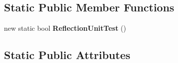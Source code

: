 \subsection*{Static Public Member Functions}
\begin{DoxyCompactItemize}
\item 
\hypertarget{class_s_e_mod_a_p_i_internal_1_1_a_p_i_1_1_entity_1_1_sector_1_1_sector_object_1_1_cube_grid_1_1da7f6e1e443b7b445548fcb53da9dcdc_a5f33f67f2f853c9a915188e126b1b757}{}new static bool {\bfseries Reflection\+Unit\+Test} ()\label{class_s_e_mod_a_p_i_internal_1_1_a_p_i_1_1_entity_1_1_sector_1_1_sector_object_1_1_cube_grid_1_1da7f6e1e443b7b445548fcb53da9dcdc_a5f33f67f2f853c9a915188e126b1b757}

\end{DoxyCompactItemize}
\subsection*{Static Public Attributes}
